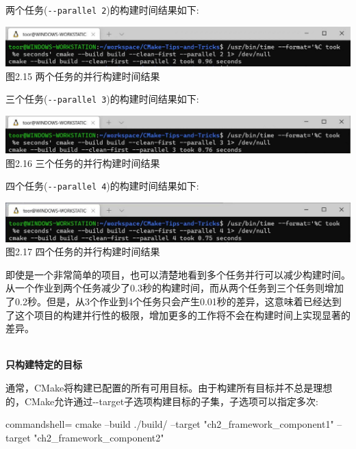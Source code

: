 两个任务(\texttt{-{}-parallel 2})的构建时间结果如下:

\begin{center}
\includegraphics[width=1.\textwidth]{content/1/chapter2/images/15.jpg}\\
图2.15 两个任务的并行构建时间结果
\end{center}

三个任务(\texttt{-{}-parallel 3})的构建时间结果如下:

\begin{center}
\includegraphics[width=1.\textwidth]{content/1/chapter2/images/16.jpg}\\
图2.16 三个任务的并行构建时间结果
\end{center}

四个任务(\texttt{-{}-parallel 4})的构建时间结果如下:

\begin{center}
\includegraphics[width=1.\textwidth]{content/1/chapter2/images/17.jpg}\\
图2.17 四个任务的并行构建时间结果
\end{center}

即使是一个非常简单的项目，也可以清楚地看到多个任务并行可以减少构建时间。从一个作业到两个任务减少了0.3秒的构建时间，而从两个任务到三个任务则增加了0.2秒。但是，从3个作业到4个任务只会产生0.01秒的差异，这意味着已经达到了这个项目的构建并行性的极限，增加更多的工作将不会在构建时间上实现显著的差异。

\hspace*{\fill} \\ %
\noindent
\textbf{只构建特定的目标}

通常，CMake将构建已配置的所有可用目标。由于构建所有目标并不总是理想的，CMake允许通过-{}-target子选项构建目标的子集，子选项可以指定多次:

\begin{tcblisting}{commandshell={}}
cmake --build ./build/ --target "ch2_framework_component1"
--target "ch2_framework_component2"
\end{tcblisting}

